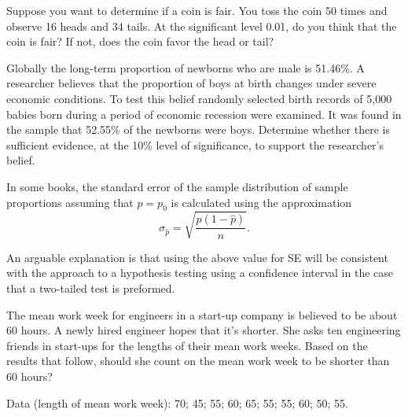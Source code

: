 \begin{example}

Suppose you want to determine if a coin is fair. You toss the coin 50
times and observe 16 heads and 34 tails. At the significant level 0.01,
do you think that the coin is fair? If not, does the coin favor the head
or tail?

\end{example}
\vspace*{8\baselineskip}

\begin{example}

Globally the long-term proportion of newborns who are male is 51.46\%. A
researcher believes that the proportion of boys at birth changes under
severe economic conditions. To test this belief randomly selected birth
records of 5,000 babies born during a period of economic recession were
examined. It was found in the sample that 52.55\% of the newborns were
boys. Determine whether there is sufficient evidence, at the 10\% level
of significance, to support the researcher's belief.

\end{example}
\vspace*{8\baselineskip}

\begin{remark}

In some books, the standard error of the sample distribution of sample
proportions assuming that \(p=p_0\) is calculated using the
approximation \[
\sigma_{\hat{p}}=\sqrt{\frac{\hat{p}(1-\hat{p})}{n}}.
\]

An arguable explanation is that using the above value for SE will be
consistent with the approach to a hypothesis testing using a confidence
interval in the case that a two-tailed test is preformed.

\end{remark}

\begin{example}

  The mean work week for engineers in a start-up company is believed to be
  about 60 hours. A newly hired engineer hopes that it's shorter. She asks
  ten engineering friends in start-ups for the lengths of their mean work
  weeks. Based on the results that follow, should she count on the mean
  work week to be shorter than 60 hours?
  
  Data (length of mean work week): 70; 45; 55; 60; 65; 55; 55; 60; 50; 55.
  
\end{example}
\vspace*{8\baselineskip}

